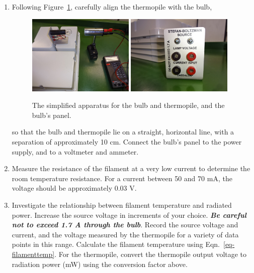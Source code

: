 \begin{enumerate}


\item Following Figure~\ref{fig:apparatus}, carefully align the thermopile with the bulb, 
\begin{figure}
\begin{centering}

\includegraphics[width=2in]{../images/BulbThermopile.jpg}
\includegraphics[width=2in]{../images/BulbPanel.jpg}
\caption{The simplified apparatus for the bulb and thermopile, and the bulb's panel.}
\label{fig:apparatus}
\end{centering}
\end{figure}
so that the bulb and thermopile lie on a straight, horizontal line, with a separation of approximately 10 cm.  Connect the bulb's panel to the power supply, and to a voltmeter and ammeter.   

\item Measure the resistance of the filament at a very low current to determine the room temperature resistance.  For a current between 50 and 70 mA, the voltage should be approximately 0.03 V.  

\item \label{sec:PvsT} Investigate the relationship between filament temperature and radiated power. Increase the source voltage in increments of your choice.  {\bf \em Be careful not to exceed 1.7 A through the bulb}.  Record the source voltage and current, and the voltage measured by the thermopile for a variety of data points in this range.  Calculate the filament temperature using Eqn.~\ref{eq-filamenttemp}.   For the thermopile, convert the thermopile output voltage to radiation power (mW) using the conversion factor above. 


\end{enumerate}
